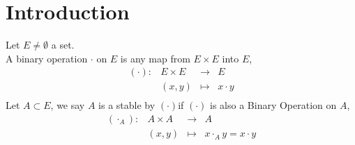 \section{Introduction}
Let $E \neq \emptyset  $ a set. \\
A binary operation $\cdot  $ on $E $ is any map from 
$E \times E  $ into $E $,
\[
\begin{array}{cccc}
  ( \cdot )  : &  E \times E   & \longrightarrow & E \\

           &  (x,y)   & \longmapsto     & x \cdot y \\ 
\end{array}
\]
Let $A \subset E $, we say $A $ is a stable by $(\cdot)  $if $(\cdot)$ is also a Binary Operation 
on $A$,
\[
\begin{array}{cccc}
  (\cdot _{A}) : &  A \times A   & \longrightarrow & A \\

           &  (x, y)   & \longmapsto     &  x \cdot _{A} y = x \cdot y\\ 
\end{array}
\]

